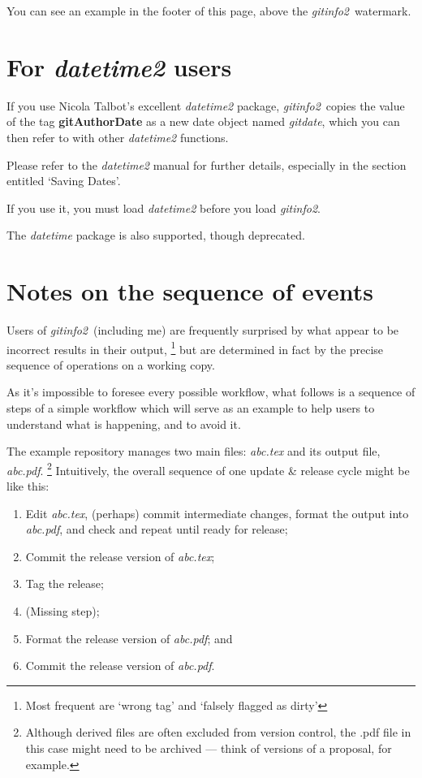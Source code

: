 \documentclass[a4paper,12pt,twoside,openany]{memoir}
\newcommand{\sfit}[1]{\textit{#1}}
\newcommand{\tpname}{\sfit{gitinfo2}}
\begin{document}
You can see an example in the footer of this page,
above the \tpname\ watermark.

\section{For \sfit{datetime2} users}
\label{sect:dtuser}
If you use Nicola Talbot's excellent \sfit{datetime2} package,
\tpname\ copies the value of the tag {\ttfamily\bfseries gitAuthorDate}
as a new date object named \sfit{gitdate},
which you can then refer to with other \sfit{datetime2}
functions.

Please refer to the \sfit{datetime2} manual for
further details,
especially in the section entitled `Saving Dates'.

If you use it, you must load \sfit{datetime2}
before you load \tpname.

The \sfit{datetime} package is also supported, 
though deprecated. 

\section{Notes on the sequence of events}
\label{sect:seqeve}
Users of \tpname\ (including me) are frequently surprised
by what appear to be incorrect results in their output,%
\footnote{Most frequent are `wrong tag' and `falsely flagged as dirty'}
but are determined in fact by the precise sequence of operations
on a working copy.

As it's impossible to foresee every possible workflow,
what follows is a sequence of steps of a simple workflow
which will serve as an example to help users
to understand what is happening, and to avoid it.

The example repository manages two main files:
\sfit{abc.tex} and its output file, \sfit{abc.pdf}.%
\footnote{Although derived files are often excluded from version control,
the .pdf file in this case might need to be archived ---
think of versions of a proposal, for example.}
Intuitively, the overall sequence of one update \& release cycle
might be like this:

\begin{enumerate}
\item Edit \sfit{abc.tex}, (perhaps) commit intermediate changes,
format the output into \sfit{abc.pdf}, and
check and repeat until ready for release;
\item \label{wf:tex} Commit the release version of \sfit{abc.tex};
\item \label{wf:tag} Tag the release;
\item \label{wf:git} (Missing step);
\item \label{wf:pdf} Format the release version of \sfit{abc.pdf}; and
\item Commit the release version of \sfit{abc.pdf}.
\end{enumerate}
\end{document}
